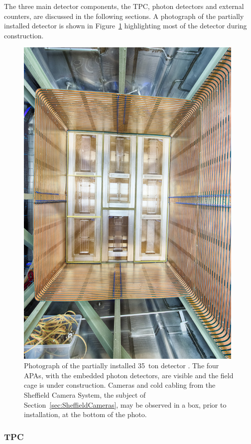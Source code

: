The three main detector components, the TPC, photon detectors and external counters, are discussed in the following sections.  A photograph of the partially installed detector is shown in Figure~\ref{fig:35tonPhoto} highlighting most of the detector during construction.

\begin{figure}
  \centering
  \includegraphics[width=11cm]{35tonPhoto.jpg}
  \caption[Photograph of the partially installed 35~ton detector.]{Photograph of the partially installed 35~ton detector \cite{VMS}.  The four APAs, with the embedded photon detectors, are visible and the field cage is under construction.  Cameras and cold cabling from the Sheffield Camera System, the subject of Section~\ref{sec:SheffieldCameras}, may be observed in a box, prior to installation, at the bottom of the photo.}
  \label{fig:35tonPhoto}
\end{figure}

\subsubsection{TPC}\label{sec:35tonTPC}

